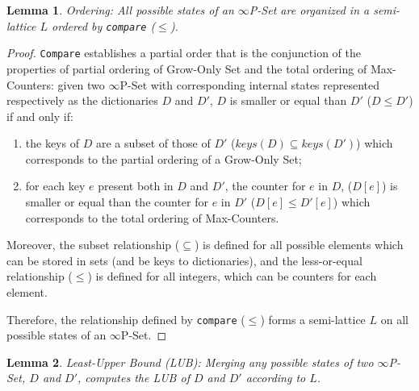 \documentclass[11pt, oneside]{article}   	%
\newtheorem{lemma}{Lemma}
\begin{document}
\begin{lemma}
Ordering: All possible states of an $\infty$P-Set are organized in a semi-lattice $L$ ordered by \texttt{compare} ($\leq$).
\end{lemma}
\begin{proof}
 \texttt{Compare} establishes a partial order that is the conjunction of the properties of partial ordering of Grow-Only Set and the total ordering of Max-Counters: given two $\infty$P-Set with corresponding internal states represented respectively as the dictionaries $D$ and $D'$, $D$ is smaller or equal than $D'$ ($D \leq D'$) if and only if: 
 \begin{enumerate}
     \item the keys of $D$ are a subset of those of $D'$ ($\textit{keys}(D) \subseteq \textit{keys}(D')$) which corresponds to the partial ordering of a Grow-Only Set; 
     \item for each key $e$ present both in $D$ and $D'$, the counter for $e$ in $D$, ($D[e]$) is smaller or equal than the counter for $e$ in $D'$ ($D[e] \leq D'[e]$) which corresponds to the total ordering of Max-Counters. 
 \end{enumerate}
 
Moreover, the subset relationship ($\subseteq$) is defined for all possible elements which can be stored in sets (and be keys to dictionaries), and the less-or-equal relationship ($\leq$) is defined for all integers, which can be counters for each element. 

Therefore, the relationship defined by \texttt{compare} ($\leq$) forms a semi-lattice $L$ on all possible states of an $\infty$P-Set.
\end{proof}

\begin{lemma}
Least-Upper Bound (LUB): Merging any possible states of two $\infty$P-Set, $D$ and $D'$,  computes the LUB of $D$ and $D'$ according to $L$.
\end{lemma}
\end{document}
